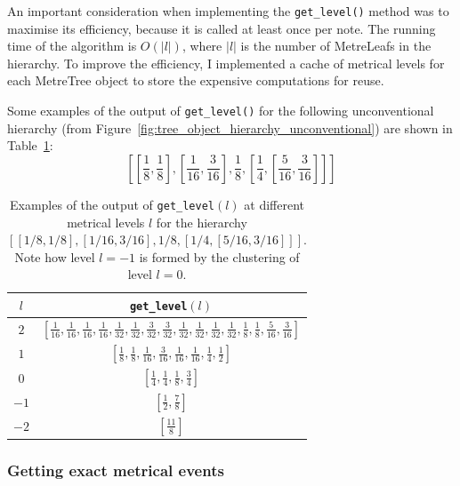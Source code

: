 \documentclass[12pt,twoside,openright]{report}
\begin{document}
An important consideration when implementing the \verb'get_level()' method was to
maximise its efficiency, because it is called at least once per note. The
running time of the algorithm is $O(\left\lvert l\right\rvert)$, where $\left\lvert l\right\rvert$ is the number of MetreLeafs in the
hierarchy. To improve the efficiency, I implemented a cache of metrical levels for each
MetreTree object to store the expensive computations for reuse.

Some examples of the output of \verb'get_level()' for the following unconventional hierarchy (from Figure~\ref{fig:tree_object_hierarchy_unconventional}) are shown in Table~\ref{table:get_level}:
\[
    \left[
        \left[\frac{1}{8},\frac{1}{8}\right],
        \left[\frac{1}{16},\frac{3}{16}\right],
        \frac{1}{8},
        \left[\frac{1}{4},\left[\frac{5}{16},\frac{3}{16}\right]\right]
    \right]
\]

\begin{table}[ht]
    \centering
    \renewcommand{\arraystretch}{2.0}
    \begin{tabular}{|c|c|}
        \hline
        $l$     & \verb'get_level'$(l)$ \\
        \hline
        $2$     & $\displaystyle \left[ \frac{1}{16},\frac{1}{16},\frac{1}{16},\frac{1}{16},\frac{1}{32},\frac{1}{32},\frac{3}{32},\frac{3}{32},\frac{1}{32},\frac{1}{32},\frac{1}{32},\frac{1}{32},\frac{1}{8},\frac{1}{8},\frac{5}{16},\frac{3}{16} \right]$ \\
        $1$     & $\displaystyle \left[ \frac{1}{8},\frac{1}{8},\frac{1}{16},\frac{3}{16},\frac{1}{16},\frac{1}{16},\frac{1}{4},\frac{1}{2} \right]$ \\
        $0$     & $\displaystyle \left[ \frac{1}{4},\frac{1}{4},\frac{1}{8},\frac{3}{4} \right]$ \\
        $-1$    & $\displaystyle \left[ \frac{1}{2},\frac{7}{8} \right]$ \\
        $-2$    & $\displaystyle \left[ \frac{11}{8} \right]$ \\ [1ex]
        \hline
    \end{tabular}
    \renewcommand{\arraystretch}{1.0}
    \cprotect\caption{Examples of the output of \verb'get_level'$(l)$ at different metrical levels $l$ for the hierarchy $[[1/8,1/8],[1/16,3/16],1/8,[1/4,[5/16,3/16]]]$. Note how level $l=-1$ is formed by the clustering of level $l=0$.}
    \label{table:get_level}
\end{table}

\subsubsection{Getting exact metrical events} \label{metrical_level_indices}
\end{document}
